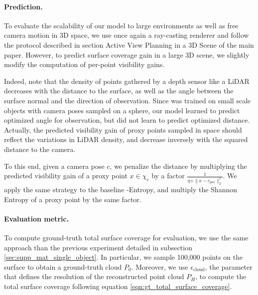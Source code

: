 \paragraph{Prediction.}
To evaluate the scalability of our model to large environments as well as free camera motion in 3D space, we use once again a ray-casting renderer and follow the protocol described in section Active View Planning in a 3D Scene of the main paper. However, to predict surface coverage gain in a large 3D scene, we slightly modify the computation of per-point visibility gains. 

Indeed, note that the density of points gathered by a depth sensor like a LiDAR decreases with the distance to the surface, as well as the angle between the surface normal and the direction of observation. Since \method was trained on small scale objects with camera poses sampled on a sphere, our model learned to predict optimized angle for observation, but did not learn to predict optimized distance. Actually, the predicted visibility gain of proxy points sampled in space should reflect the variations in LiDAR density, and decrease inversely with the squared distance to the camera. 

To this end, given a camera pose $c$, we penalize the distance by multiplying the predicted visibility gain of a proxy point $x\in\chi_c$ by a factor $\frac{1}{\eta + \|x-c_{pos}\|_2^2}$. We apply the same strategy to the baseline \method-Entropy, and multiply the Shannon Entropy of a proxy point by the same factor.

\paragraph{Evaluation metric.}
To compute ground-truth total surface coverage for evaluation, we use the same approach than the previous experiment detailed in subsection \ref{sec:supp_mat_single_object}. In particular, we sample 100,000 points on the surface to obtain a ground-truth cloud $P_0$. Moreover, we use $\epsilon_\text{cloud}$, the parameter that defines the resolution of the reconstructed point cloud $P_H$, to compute the total surface coverage following equation \ref{eqn:gt_total_surface_coverage}.

